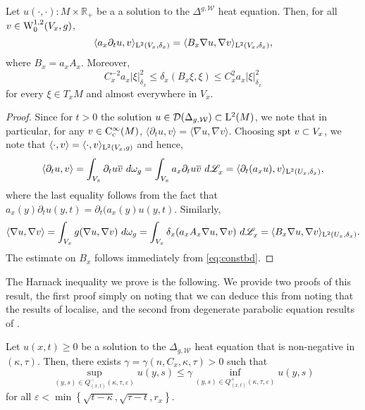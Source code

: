 \documentclass[a4paper, 12pt]{amsart}
\numberwithin{equation}{section}
\renewcommand{\~}{\tilde}
\renewcommand{\-}{\bar}
\newcommand{\R}{\mathbb{R}}
\newcommand{\8}{\infty}
\newcommand{\cW}{\mathcal{W}}
\newcommand{\dbrac}[1]{\left\{#1\right\}}
\newcommand{\modulus}[1]{|#1|}
\newcommand{\set}[1]{\dbrac{#1}}
\newcommand{\dom}{ {\mathcal{D}}}
\newcommand{\script}[1]{\mathscr{#1}}
\renewcommand{\epsilon}{\varepsilon}
\newcommand{\spt}[1]{{\rm spt} {\text{ }}#1}	%
\newcommand{\inprod}[1]{\langle #1 \rangle}	%
\newcommand{\Leb}[1][{}]{\script{L}^{#1}}			%
\newcommand{\conj}[1]{\overline{#1}}				%
\newcommand{\Lp}[2][{}]{{\rm L}^{#2}_{\rm #1}}		%
\newcommand{\Ck}[2][{}]{{\rm C}^{#2}_{\rm #1}}		%
\newcommand{\Sob}[2][{}]{{\rm W}^{#2}_{\rm #1}}		%
\newcommand{\SobH}[2][{}]{{\Sob[#1]{#2,2}}}	%
\begin{document}
\begin{lemma}
\label{eq:soln1}
Let $u(\cdot, \cdot): M \times \R_+$  be a a solution to the $\Delta^{g,\cW}$ heat equation.
Then, for all $v \in \SobH[0]{1}(V_x,g)$, 
	\begin{equation} 
	\label{eq:testfn1}	 
	\inprod{a_x \partial_t u, v}_{\Lp{2}(V_x, \delta_x)} 
		= \inprod{ B_x \nabla u, \nabla v}_{\Lp{2}(V_x, \delta_x)},
	\end{equation}
where $B_x = a_x A_x$. Moreover,
\begin{equation}
\label{eq:coeff}
C_x^{-2} a_x \modulus{\xi}_{\delta_x}^2 \leq \delta_x(B_x \xi, \xi) 
	\leq C_x^2 a_x \modulus{\xi}_{\delta_x}^2
\end{equation} 
for every $\xi \in T_xM$ and almost everywhere in $V_x$. 
\end{lemma}
\begin{proof}
Since for $t > 0$ the solution $u \in \dom(\Delta_{g,\cW}) \subset \Lp{2}(M)$, we
note that in particular, for any $v \in \Ck[c]{\infty}(M)$, 
$\inprod{\partial_t u, v} = \inprod{\nabla u, \nabla v}$.
Choosing $\spt v \subset V_x$, we note that $\inprod{\cdot, v} = \inprod{\cdot, v}_{\Lp{2}(V_x,g)}$
and hence,
$$\inprod{\partial_t u, v} = \int_{V_x} \partial_t u\conj{v}\ d\omega_g 
	= \int_{V_x} a_x \partial_t  u \conj{v}\ d\Leb_x
	= \inprod{\partial_t (a_x u), v}_{\Lp{2}(U_x, \delta_x)},$$
where the last equality follows from the fact that 
$a_x(y) \partial_t u(y,t) = \partial_t (a_x(y)u(y,t).$
Similarly,
$$\inprod{\nabla u, \nabla v} 
	= \int_{V_x} g(\nabla u, \nabla v)\ d\omega_g
	= \int_{V_x} \delta_x(a_x A_x \nabla u, \nabla v)\ d\Leb_x
	= \inprod{B_x \nabla u, \nabla v}_{\Lp{2}(U_x, \delta_x)}.$$
The estimate on $B_x$ follows immediately from
\eqref{eq:constbd}.
\end{proof} 

The Harnack inequality we prove is the following. We provide two proofs of this result, 
the first proof simply on noting that we can deduce this from noting that the results
of \cite{SC} localise, and the second from degenerate parabolic equation results of \cite{CS}.

\begin{thm}
\label{thm:Harnack}
Let $u(x,t) \geq 0$ be a
solution to the $\Delta_{g,\cW}$ heat equation 
that is non-negative in $(\kappa, \tau)$. 
Then, there exists $\gamma = \gamma(n, C_x, \kappa, \tau) > 0$ such that 
$$ \sup_{(y,s) \in Q^-_{(x,t)}(\kappa, \tau,\epsilon)} u(y, s) 
	\leq \gamma \inf_{(y,s) \in Q^+_{(x,t)}(\kappa,\tau,\epsilon)} u(y,s)$$
for all $\epsilon < \min\set{ \sqrt{t - \kappa}, \sqrt{\tau - t}, r_x}$.
\end{thm}
\end{document}
